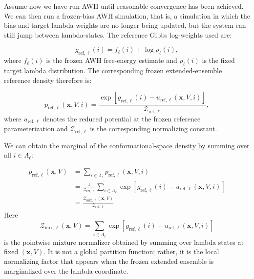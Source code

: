 Assume now we have run AWH until reasonable convergence has been achieved. We can then run a frozen-bias AWH simulation, that is, a simulation in which the bias and target lambda weights are no longer being updated, but the system can still jump between lambda-states. The reference Gibbs log-weights used are:

\begin{equation}
    g_{\mathrm{ref},\ell}(i)
    =
    f_\ell(i)
    +
    \log \rho_\ell(i),
    \label{eq:gref}
\end{equation}
%
where $f_\ell(i)$ is the frozen AWH free-energy estimate and $\rho_\ell(i)$ is the fixed target lambda distribution. The corresponding frozen extended-ensemble reference density therefore is:

\begin{equation}
    p_{\mathrm{ref},\ell}(\mathbf{x}, V, i)
    =
    \frac{
        \exp \left[
            g_{\mathrm{ref},\ell}(i)
            -
            u_{\mathrm{ref},\ell}(\mathbf{x}, V, i)
        \right]
    }{
        \mathcal{Z}_{\mathrm{ref},\ell}
    },
    \label{eq:pref}
\end{equation}
%
where $u_{\mathrm{ref},\ell}$ denotes the reduced potential at the frozen reference parameterization and $\mathcal{Z}_{\mathrm{ref},\ell}$ is the corresponding normalizing constant.

We can obtain the marginal of the conformational-space density by summing over all $i \in \Lambda_\ell$:

\begin{align}
    p_{\mathrm{ref},\ell}(\mathbf{x}, V)
    &=
    \sum_{i\in\Lambda_\ell}{p_{\mathrm{ref},\ell}(\mathbf{x}, V, i)}
    \nonumber\\
    &=
    \frac{1}{\mathcal{Z}_{\mathrm{ref},\ell}}\sum_{i\in\Lambda_\ell}{\exp\left[g_{\mathrm{ref},\ell}(i) - u_{\mathrm{ref},\ell}(\mathbf{x}, V, i)\right]}
    \nonumber\\
    &= 
    \frac{\mathcal{Z}_{\mathrm{mix},\ell}(\mathbf{x}, V)}{\mathcal{Z}_{\mathrm{ref},\ell}}
    \label{eq:pref_int}
\end{align}
%
Here
\[
    \mathcal{Z}_{\mathrm{mix},\ell}(\mathbf{x}, V)
    =
    \sum_{i\in\Lambda_\ell}{\exp\left[g_{\mathrm{ref},\ell}(i) - u_{\mathrm{ref},\ell}(\mathbf{x}, V, i)\right]}
\]
is the pointwise mixture normalizer obtained by summing over lambda states at fixed $(\mathbf{x}, V)$. It is not a global partition function; rather, it is the local normalizing factor that appears when the frozen extended ensemble is marginalized over the lambda coordinate.


